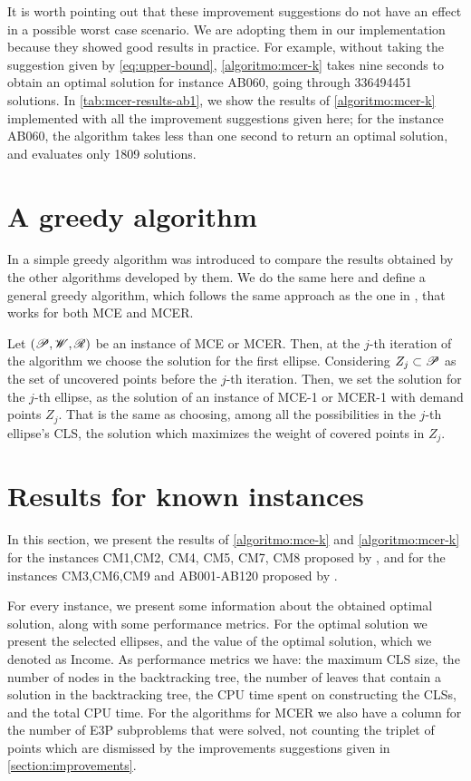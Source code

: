 It is worth pointing out that these improvement suggestions do not have an effect in a possible worst case scenario. We are adopting them in our implementation because they showed good results in practice.
For example, without taking the suggestion given by \autoref{eq:upper-bound}, \autoref{algoritmo:mcer-k} takes nine seconds to obtain an optimal solution for instance AB060, going through \num{336494451} solutions.
In \autoref{tab:mcer-results-ab1}, we show the results of \autoref{algoritmo:mcer-k} implemented with all the improvement suggestions given here; for the instance AB060, the algorithm takes less than one second to return an optimal solution, and evaluates only \num{1809} solutions.

\section{A greedy algorithm}

In  a simple greedy algorithm was introduced to compare the results obtained by the other algorithms developed by them. We do the same here and define a general greedy algorithm, which follows the same approach as the one in , that works for both MCE and MCER.

Let $(\mathscr{P}, \mathscr{W}, \mathscr{R})$ be an instance of MCE or MCER. Then, at the $j$-th iteration of the algorithm we choose the solution for the first ellipse. Considering $Z_j \subset \mathscr{P}$ as the set of uncovered points before the $j$-th iteration. Then, we set the solution for the $j$-th ellipse, as the solution of an instance of MCE-1 or MCER-1 with demand points $Z_j$.
That is the same as choosing, among all the possibilities in the $j$-th ellipse's CLS, the solution which maximizes the weight of covered points in $Z_j$.

\section{Results for known instances}

In this section, we present the results of \autoref{algoritmo:mce-k} and \autoref{algoritmo:mcer-k} for the instances CM1,CM2, CM4, CM5, CM7, CM8 proposed by , and for the instances CM3,CM6,CM9 and AB001-AB120 proposed by .

For every instance, we present some information about the obtained optimal solution, along with some performance metrics.
For the optimal solution we present the selected ellipses, and the value of the optimal solution, which we denoted as Income.
As performance metrics we have: the maximum CLS size, the number of nodes in the backtracking tree, the number of leaves that contain a solution in the backtracking tree, the CPU time spent on constructing the CLSs, and the total CPU time.
For the algorithms for MCER we also have a column for the number of E3P subproblems that were solved, not counting the triplet of points which are dismissed by the improvements suggestions given in \autoref{section:improvements}.


